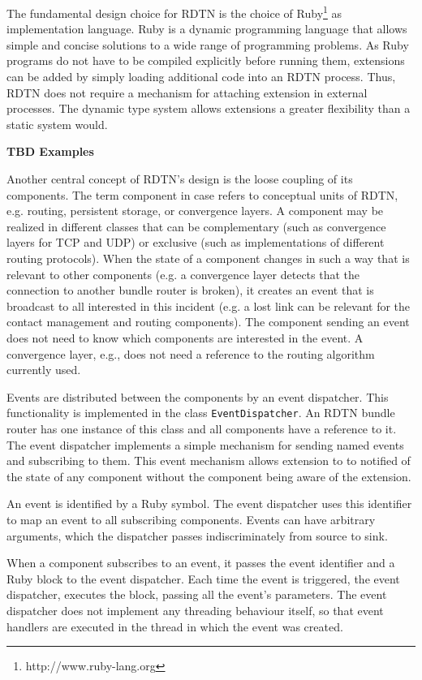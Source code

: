 \documentclass{article}
\begin{document}
The fundamental design choice for RDTN is the choice of
Ruby\footnote{http://www.ruby-lang.org} as implementation language. Ruby is a
dynamic programming language that allows simple and concise solutions to a wide
range of programming problems. As Ruby programs do not have to be compiled
explicitly before running them, extensions can be added by simply loading
additional code into an RDTN process. Thus, RDTN does not require a mechanism
for attaching extension in external processes. The dynamic type system allows
extensions a greater flexibility than a static system would.

{\bf TBD Examples}

Another central concept of RDTN's design is the loose coupling of its
components. The term component in case refers to conceptual units of RDTN, e.g.
routing, persistent storage, or convergence layers. A component may be realized
in different classes that can be complementary (such as convergence layers for
TCP and UDP) or exclusive (such as implementations of different routing
protocols). When the state of a component changes in such a way that is relevant
to other components (e.g. a convergence layer detects that the connection to
another bundle router is broken), it creates an event that is broadcast to all
interested in this incident (e.g. a lost link can be relevant for the contact
management and routing components). The component sending an event does not need
to know which components are interested in the event. A convergence layer, e.g.,
does not need a reference to the routing algorithm currently used.

Events are distributed between the components by an event dispatcher. This
functionality is implemented in the class {\tt EventDispatcher}. An RDTN bundle
router has one instance of this class and all components have a reference to it.
The event dispatcher implements a simple mechanism for sending named events and
subscribing to them.  This event mechanism allows extension to to notified of
the state of any component without the component being aware of the extension.

An event is identified by a Ruby symbol. The event dispatcher uses this
identifier to map an event to all subscribing components. Events can have
arbitrary arguments, which the dispatcher passes indiscriminately from source to
sink.

When a component subscribes to an event, it passes the event identifier and a
Ruby block to the event dispatcher. Each time the event is triggered, the event
dispatcher, executes the block, passing all the event's parameters.  The event
dispatcher does not implement any threading behaviour itself, so that event
handlers are executed in the thread in which the event was created.
\end{document}
